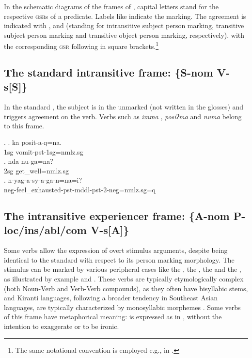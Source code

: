 In the schematic diagrams of the frames of ,  capital letters stand for the respective \textsc{gsr}s of a predicate. Labels like  indicate the  marking. The agreement is indicated with ,  and  (standing for intransitive subject person marking, transitive subject person marking and transitive object person marking, respectively), with the corresponding \textsc{gsr} following in square brackets.\footnote{The same notational convention is employed  e.g., in \citet{Schikowski2014_Flexible}.} 
 

\subsection[The standard intransitive frame]{The standard intransitive frame: {\bf \{S-{\sc nom} V-s[S]\}}}\label{stand-itr}


\noindent 
In the standard , the subject is in the unmarked   (not written in the glosses) and triggers agreement on the verb. Verbs such as \emph{imma} ,  \emph{posiʔma}  and \emph{numa}  belong to this frame.

\ex. \ag. ka posit-a-ŋ=na.\\
		 {\sc 1sg} vomit-{\sc pst-1sg=nmlz.sg}	\\
 	\bg. nda nu-ga=na?\\
	{\sc 2sg}  get\_well{=nmlz.sg}	\\
	\bg. n-yag-a-sy-a-ga-n=na=i?\\ 
{\sc neg}-feel\_exhausted{\sc -pst-mddl-pst-2-neg=nmlz.sg=q}\\

\subsection[The intransitive experiencer frame]{The intransitive experiencer frame: \{A-{\sc nom} P-{\sc loc/ins/abl/com} V-s[A]\}}\label{itr-exp}


\noindent 
Some  verbs allow the expression of overt stimulus arguments, despite being identical to  the standard  with respect to its person marking morphology. The stimulus can be marked by various peripheral cases like the , the , the  and the , as illustrated by example \Next[a] and \Next[b].  These  verbs are typically etymologically complex (both Noun-Verb and Verb-Verb compounds), as they often have bisyllabic stems, and Kiranti languages, following a broader tendency in Southeast Asian languages, are typically characterized by monosyllabic morphemes \citep{Matisoff1990_Bulging}. Some verbs of this frame have metaphorical meaning:  is expressed as in \Next[c], without the intention to exaggerate or to be ironic. 

